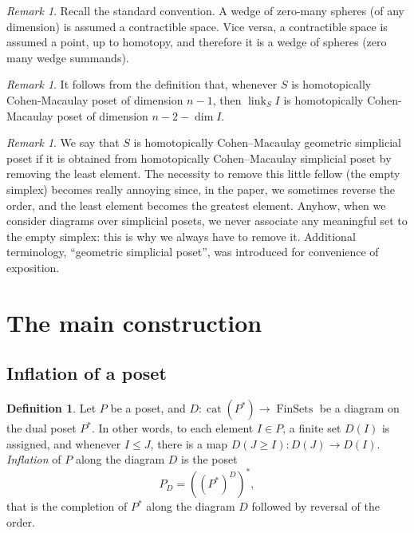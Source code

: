 \documentclass[english,12pt,oneside]{amsproc}
\DeclareMathOperator{\cat}{cat}
\DeclareMathOperator{\FinSets}{FinSets}
\DeclareMathOperator{\link}{link}
\newcounter{stmcounter}[section]
\numberwithin{equation}{section}
\theoremstyle{plain}
\theoremstyle{definition}
\newtheorem{defin}[stmcounter]{Definition}
\theoremstyle{remark}
\newtheorem{rem}[stmcounter]{Remark}
\begin{document}
\begin{rem}\label{remZeroWedge}
Recall the standard convention. A wedge of zero-many spheres (of any dimension) is assumed a contractible space. Vice versa, a contractible space is assumed a point, up to homotopy, and therefore it is a wedge of spheres (zero many wedge summands).
\end{rem}

\begin{rem}
It follows from the definition that, whenever $S$ is homotopically Cohen-Macaulay poset of dimension $n-1$, then $\link_SI$ is homotopically Cohen-Macaulay poset of dimension $n-2-\dim I$.
\end{rem}

\begin{rem}
We say that $S$ is homotopically Cohen--Macaulay geometric simplicial poset if it is obtained from homotopically Cohen--Macaulay simplicial poset by removing the least element. The necessity to remove this little fellow (the empty simplex) becomes really annoying since, in the paper, we sometimes reverse the order, and the least element becomes the greatest element. Anyhow, when we consider diagrams over simplicial posets, we never associate any meaningful set to the empty simplex: this is why we always have to remove it. Additional terminology, ``geometric simplicial poset'', was introduced for convenience of exposition.
\end{rem}



\section{The main construction}\label{secInflation}

\subsection{Inflation of a poset}

\begin{defin}\label{definInflation}
Let $P$ be a poset, and $D\colon \cat(P^*)\to \FinSets$ be a diagram on the dual poset $P^*$. In other words, to each element $I\in P$, a finite set $D(I)$ is assigned, and whenever $I\leqslant J$, there is a map $D(J\geqslant I)\colon D(J)\to D(I)$. \emph{Inflation} of $P$ along the diagram $D$ is the poset
\[
P_D=((P^*)^D)^*,
\]
that is the completion of $P^*$ along the diagram $D$ followed by reversal of the order.
\end{defin}
\end{document}
